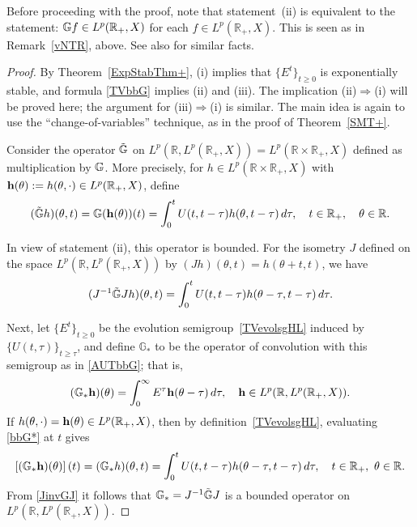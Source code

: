 \documentclass[10pt,psamsfonts,leqno]{siamltex}
\newcommand{\bbR}{\mathbb{R}}
\newcommand{\bbG}{\mathbb{G}}
\begin{document}
\noindent Before proceeding with the proof,
note that statement~(ii) is equivalent
to the statement: $\Bbb{G}f\in
L^p(\bbR_+,X)$ for each $f\in
L^p(\bbR_+,X)$. This is seen as
in Remark~\ref{vNTR}, above. See also \cite{Buse}
for similar facts.

\begin{proof}
By Theorem~\ref{ExpStabThm+}, (i) implies
that $\{E^t\}_{t\ge0}$ is exponentially stable, and
formula \eqref{TVbbG} implies (ii)
and (iii).  The implication (ii)$\Rightarrow$(i)
will be proved here; the argument for (iii)$\Rightarrow$(i) is
similar.  The main idea is again to use the ``change-of-variables''
technique, as in the proof of
Theorem~\ref{SMT+}.

Consider the operator $\tilde{\Bbb{G}}$
on $L^p(\bbR,L^p(\bbR_+,X)) =L^p(\bbR\times \bbR_+,X)$
defined as multiplication by $\Bbb{G}$.  More precisely,
for $h\in L^p(\bbR\times \bbR_+,X)$ with
${\bf h}(\theta):=h(\theta,\cdot)\in L^p(\bbR_+,X)$, define
$$
(\tilde{\Bbb{G}}h)(\theta ,t )=\Bbb{G}({\bf h}(\theta))(t )=
\int^t _0U(t  ,t -\tau)h(\theta ,t  -\tau)\,d\tau,\quad
t  \in \bbR_+,\quad \theta \in\bbR.
$$

In view of statement (ii), this operator is bounded.
For the isometry $J$ defined on the space
$L^p(\bbR,L^p(\bbR_+,X))$ by
$(Jh)(\theta ,t  )=h(\theta +t ,t  )$, we have
\begin{equation}\label{JinvGJ}
(J^{-1} \tilde{\Bbb{G}}Jh)(\theta,t )
=\int^t _0 U(t  ,t  -\tau)
h(\theta -\tau,t  -\tau)\,d\tau.
\end{equation}

Next, let  $\{E^t\}_{t\ge0}$ be the evolution
semigroup~\eqref{TVevolsgHL} induced by
$\{U(t,\tau)\}_{t\ge\tau}$, and define $\bbG_*$ to be the operator
of convolution with this semigroup as in \eqref{AUTbbG}; that is,
\begin{equation}\label{bbG*}
(\bbG_*{\bf h})(\theta)=
\int^\infty_0 E^\tau {\bf h}(\theta -\tau)\,d\tau,\quad
{\bf h}\in L^p(\bbR,L^p(\bbR_+,X)).
\end{equation}
If $h(\theta,\cdot)={\bf h}(\theta)\in L^p(\bbR_+,X)$, then by
definition~\eqref{TVevolsgHL}, evaluating \eqref{bbG*} at $t$ gives
\begin{equation}\label{bbG*2}
\left[(\bbG_*{\bf h})(\theta)\right](t)=(\bbG_*h)(\theta ,t  )=
\int^t _0U(t ,t -\tau)h(\theta -\tau,t  -\tau)\,d\tau,
\quad t  \in \bbR_+,\ \theta \in \bbR.
\end{equation} From \eqref{JinvGJ} it follows that
$\bbG_*=J^{-1}\tilde{\Bbb{G}}J$
is a bounded operator on $L^p(\bbR,L^p(\bbR_+,X))$.


\end{proof}
\end{document}
